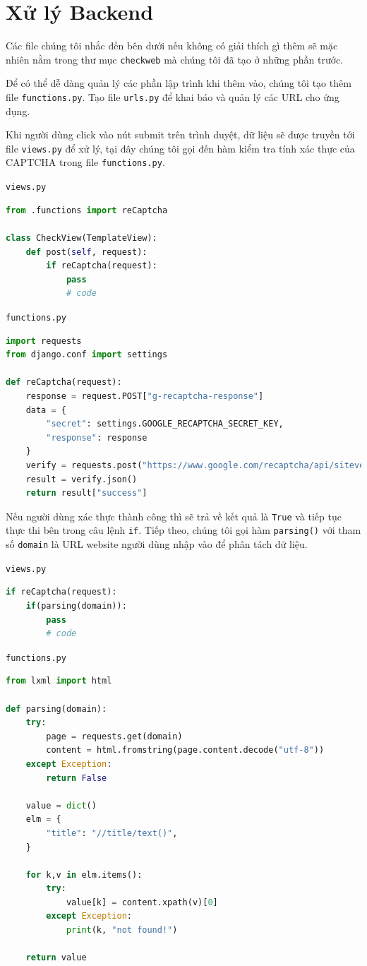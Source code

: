 \section{Xử lý Backend}
Các file chúng tôi nhắc đến bên dưới nếu không có giải thích gì thêm sẽ mặc nhiên nằm trong thư mục \texttt{checkweb} mà chúng tôi đã tạo ở những phần trước.
\par
Để có thể dễ dàng quản lý các phần lập trình khi thêm vào, chúng tôi tạo thêm file \texttt{functions.py}. Tạo file \texttt{urls.py} để khai báo và quản lý các URL cho ứng dụng.
\par
Khi người dùng click vào nút submit trên trình duyệt, dữ liệu sẽ được truyền tới file \texttt{views.py} để xử lý, tại đây chúng tôi gọi đến hàm kiểm tra tính xác thực của CAPTCHA trong file \texttt{functions.py}.
\par
\texttt{views.py}
\begin{lstlisting}[language=Python]
from .functions import reCaptcha

class CheckView(TemplateView):
	def post(self, request):
		if reCaptcha(request):
			pass
			# code
\end{lstlisting}
\par
\texttt{functions.py}
\begin{lstlisting}[language=Python]
import requests
from django.conf import settings

def reCaptcha(request):
	response = request.POST["g-recaptcha-response"]
	data = {
		"secret": settings.GOOGLE_RECAPTCHA_SECRET_KEY,
		"response": response
	}
	verify = requests.post("https://www.google.com/recaptcha/api/siteverify", data=data)
	result = verify.json()
	return result["success"]
\end{lstlisting}
\par
Nếu người dùng xác thực thành công thì sẽ trả về kết quả là \texttt{True} và tiếp tục thực thi bên trong câu lệnh \texttt{if}. Tiếp theo, chúng tôi gọi hàm \texttt{parsing()} với tham số \texttt{domain} là URL website người dùng nhập vào để phân tách dữ liệu.
\par
\texttt{views.py}
\begin{lstlisting}[language=Python]
if reCaptcha(request):
	if(parsing(domain)):
		pass
		# code
\end{lstlisting}
\par
\texttt{functions.py}
\begin{lstlisting}[language=Python]
from lxml import html

def parsing(domain):
	try:
		page = requests.get(domain)
		content = html.fromstring(page.content.decode("utf-8"))
	except Exception:
		return False
		
	value = dict()
	elm = {
        "title": "//title/text()",
	}
	
	for k,v in elm.items():
		try:
			value[k] = content.xpath(v)[0]
		except Exception:
			print(k, "not found!")
			
	return value
\end{lstlisting}
